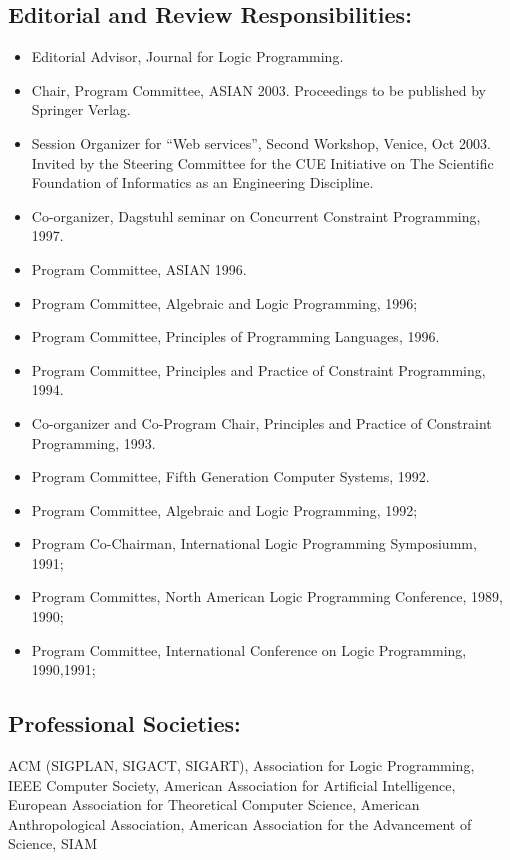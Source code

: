 \documentclass{article}
\begin{document}
\subsection*{Editorial and Review Responsibilities: }
\begin{itemize}
  \item Editorial Advisor, Journal for Logic Programming. 
  \item Chair, Program Committee, ASIAN 2003. Proceedings to be
  published by Springer Verlag.
  \item Session Organizer for ``Web services'', Second Workshop,
  Venice, Oct 2003. Invited by the Steering Committee for the CUE
  Initiative on The Scientific Foundation of Informatics as an
  Engineering Discipline.
  \item Co-organizer, Dagstuhl seminar on Concurrent Constraint
    Programming, 1997.
  \item Program Committee, ASIAN 1996.
  \item Program Committee, Algebraic and Logic Programming, 1996; 
  \item Program Committee, Principles of Programming Languages,  1996.

  \item Program Committee, Principles and Practice of Constraint
  Programming, 1994.
  \item Co-organizer and Co-Program Chair, Principles and Practice of
  Constraint Programming, 1993.
  \item Program Committee, Fifth Generation Computer Systems, 1992.
  \item Program Committee, Algebraic and Logic Programming,  1992; 
  \item Program Co-Chairman, International  Logic Programming Symposiumm, 1991;
  \item Program Committes, North American Logic Programming
  Conference, 1989, 1990;
  \item Program Committee, International Conference on Logic
  Programming, 1990,1991;
\end{itemize}


\subsection*{Professional Societies:}

ACM (SIGPLAN, SIGACT, SIGART), Association for Logic Programming,
IEEE Computer Society, American Association for Artificial
Intelligence, European Association for Theoretical Computer Science, 
American Anthropological Association,
American Association for the Advancement of Science,
SIAM
\end{document}
